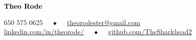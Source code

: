 \documentclass[9pt]{developercv} %
\begin{document}
	
	
	
	


{{\Huge\textcolor{black}{\textbf{{Theo Rode}}}}}

\vspace{0.2cm}
650 575 0625 $\quad\bullet\quad$ \href{mailto:theorodester@gmail.com}{theorodester@gmail.com} \\
\href{https://www.linkedin.com/in/theorode/}{linkedin.com/in/theorode/} $\quad\bullet\quad$ \href{https://github.com/TheSharkhead2}{github.com/TheSharkhead2}
\end{document}
